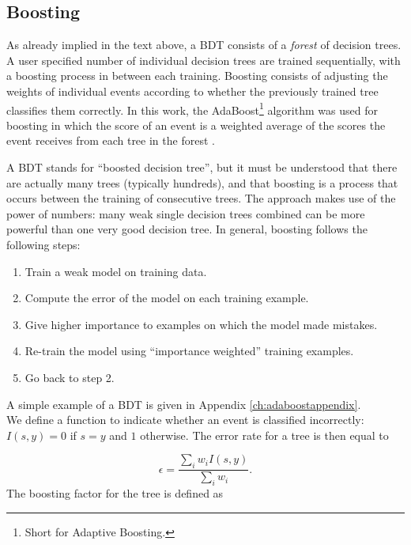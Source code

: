 \subsection{Boosting}
\label{subsec:boosting}
As already implied in the text above, a BDT consists of a \textit{forest} of decision trees. A user specified number of individual decision trees are trained sequentially, with a boosting process in between each training. Boosting consists of adjusting the weights of individual events according to whether the previously trained tree classifies them correctly. In this work, the AdaBoost\footnote{Short for Adaptive Boosting.} algorithm was used for boosting in which the score of an event is a weighted average of the scores the event receives from each tree in the forest \cite{FREUND1997119}.

A BDT stands for ``boosted decision tree'', but it must be understood that there are actually many trees (typically hundreds), and that boosting is a process that occurs between the training of consecutive trees. The approach makes use of the power of numbers: many weak single decision trees combined can be more powerful than one very good decision tree. In general, boosting follows the following steps:
\vspace{2mm}

\begin{enumerate}
\item Train a weak model on training data.
\item Compute the error of the model on each training example.
\item Give higher importance to examples on which the model made mistakes.
\item Re-train the model using ``importance weighted'' training examples.
\item Go back to step 2.
\end{enumerate}
\vspace{2mm}
A simple example of a BDT is given in Appendix \ref{ch:adaboostappendix}.\\
\newline
\noindent We define a function to indicate whether an event is classified incorrectly: $I(s,y)=0$ if $s=y$ and $1$ otherwise. The error rate for a tree is then equal to

\begin{equation}
\epsilon = \frac{\sum_i w_i I(s,y)}{\sum_i w_i}.
\end{equation}
\noindent The boosting factor for the tree is defined as

